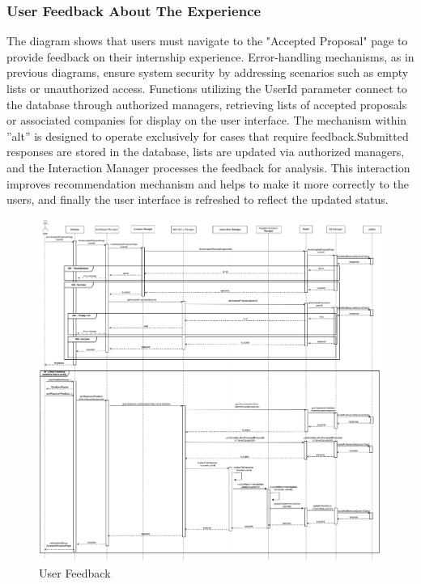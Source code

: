 \documentclass[a4paper,12pt]{article}
\begin{document}
\subsubsection*{ User Feedback About The Experience}
The diagram shows that users must navigate to the "Accepted Proposal" page to provide feedback on their internship experience. Error-handling mechanisms, as in previous diagrams, ensure system security by addressing scenarios such as empty lists or unauthorized access. Functions utilizing the UserId parameter connect to the database through authorized managers, retrieving lists of accepted proposals or associated companies for display on the user interface. The mechanism within ''alt'' is designed to operate exclusively for cases that require feedback.Submitted responses are stored in the database, lists are updated via authorized managers, and the Interaction Manager processes the feedback for analysis. This interaction improves recommendation mechanism and helps to make it more correctly to the users, and finally the user interface is refreshed to reflect the updated status.
    \begin{figure}[H]
    \centering
    \includegraphics[scale = 0.25]{DD_figures/RuntimeView/userGivesFeedback.drawio.png}
    \caption{User Feedback}
\end{figure}
\end{document}
